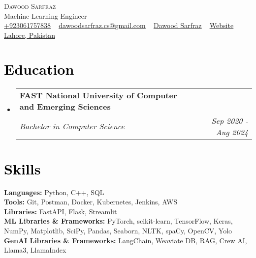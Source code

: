 \documentclass[letterpaper,11pt]{article}
\makeatletter
\newcommand{\resumeSubheading}[4]{
	\vspace{-2pt}\item
	\begin{tabular*}{1.0\textwidth}[t]{l@{\extracolsep{\fill}}r}
		\textbf{\large#1} & \textbf{\small #2} \\
		\textit{\large#3} & \textit{\small #4} \\
		
	\end{tabular*}\vspace{-7pt}
}
\newcommand{\resumeSubHeadingListStart}{\begin{itemize}[leftmargin=0.0in, label={}]}
\newcommand{\resumeSubHeadingListEnd}{\end{itemize}}
\makeatother
\begin{document}
	
	
	
	\begin{center}
		{\Huge \scshape Dawood Sarfraz} \\ \vspace{5pt}
		{\Large{Machine Learning Engineer}} \\ \vspace{5pt}
		\small 
		\href{tel:+9203061757838}{\raisebox{-0.1\height}{\faPhone} \underline{{+923061757838}}} ~ 
		\href{mailto:dawoodsarfraz.cs@gmail.com}{\raisebox{-0.2\height}{\faEnvelope} \underline{{dawoodsarfraz.cs@gmail.com}}} ~ 
		\href{https://linkedin.com/in/dawood-sarfraz-0466541b6}{\raisebox{-0.2\height}{\faLinkedin}  \underline{{Dawood Sarfraz}}} ~
		\href{https://dawoodsarfraz.github.io/}{\raisebox{-0.2\height}{\faGlobe} \underline{{Website}}}
		~ 
		\href{https://maps.app.goo.gl/DdjDSuGCuwkG288CA}{ \underline{{Lahore, Pakistan}}} 
		\vspace{-5pt}
	\end{center}
	
	
	\section{\textcolor{black}{Education}}
	\resumeSubHeadingListStart
	\resumeSubheading
	{FAST National University of Computer and Emerging Sciences}{}
	{Bachelor in Computer Science }{Sep 2020 - Aug 2024}
	\resumeSubHeadingListEnd
	\vspace{-10pt}

	\section{\textcolor{black}{Skills}}
	\begin{itemize}[leftmargin=0.01in, label={}]
		{\item{
				\textbf{\normalsize{Languages:}}{ \normalsize{Python, C++, SQL}} \\
				\textbf{\normalsize{Tools:}}{ \normalsize{Git, Postman, Docker, Kubernetes, Jenkins, AWS}} \\	
				\textbf{\normalsize{Libraries:}}{ \normalsize{FastAPI, Flask, Streamlit}}\\	
				\textbf{\normalsize{ML Libraries \& Frameworks:}}{ \normalsize{PyTorch, scikit-learn, TensorFlow, Keras, NumPy, Matplotlib, SciPy, Pandas, Seaborn, NLTK, spaCy, OpenCV, Yolo}} \\
				\textbf{\normalsize{GenAI Libraries \& Frameworks:}}{ \normalsize{LangChain, Weaviate DB, RAG, Crew AI, Llama3, LlamaIndex}} \\
		}}
	\end{itemize}
	\vspace{-10pt}
	
\end{document}
